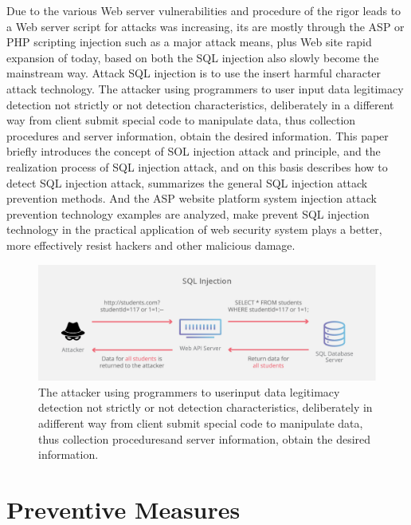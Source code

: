 \documentclass[letterpaper,12pt]{article}
\begin{document}
Due to the various Web server vulnerabilities and procedure of the rigor leads to a Web server script for
attacks was increasing, its are mostly through the ASP or PHP scripting injection such as a major attack means,
plus Web site rapid expansion of today, based on both the SQL injection also slowly become the mainstream way.
Attack SQL injection is to use the insert harmful character attack technology. The attacker using programmers to
user input data legitimacy detection not strictly or not detection characteristics, deliberately in a different way from
client submit special code to manipulate data, thus collection procedures and server information, obtain the desired
information. This paper briefly introduces the concept of SOL injection attack and principle, and the realization
process of SQL injection attack, and on this basis describes how to detect SQL injection attack, summarizes the
general SQL injection attack prevention methods. And the ASP website platform system injection attack
prevention technology examples are analyzed, make prevent SQL injection technology in the practical application
of web security system plays a better, more effectively resist hackers and other malicious damage.

\begin{figure}[!h]
    \centering
    \includegraphics[width=.8\textwidth]{pic2.png}
    \caption{The attacker using programmers to userinput data legitimacy detection not strictly or not detection characteristics, deliberately in adifferent way from client submit special code to manipulate data, thus collection proceduresand server information,  obtain the desired information.}
\end{figure}

\section{Preventive Measures}
\end{document}
